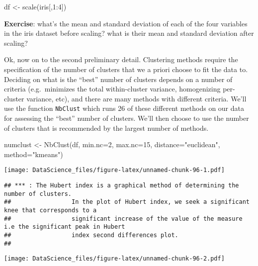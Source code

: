 \documentclass[
]{book}
\newenvironment{Shaded}{\begin{snugshade}}{\end{snugshade}}
\newcommand{\AttributeTok}[1]{\textcolor[rgb]{0.77,0.63,0.00}{#1}}
\newcommand{\DecValTok}[1]{\textcolor[rgb]{0.00,0.00,0.81}{#1}}
\newcommand{\FunctionTok}[1]{\textcolor[rgb]{0.00,0.00,0.00}{#1}}
\newcommand{\NormalTok}[1]{#1}
\newcommand{\OtherTok}[1]{\textcolor[rgb]{0.56,0.35,0.01}{#1}}
\newcommand{\SpecialCharTok}[1]{\textcolor[rgb]{0.00,0.00,0.00}{#1}}
\newcommand{\StringTok}[1]{\textcolor[rgb]{0.31,0.60,0.02}{#1}}
\begin{document}
\begin{Shaded}
\begin{Highlighting}[]
\NormalTok{df }\OtherTok{\textless{}{-}} \FunctionTok{scale}\NormalTok{(iris[,}\DecValTok{1}\SpecialCharTok{:}\DecValTok{4}\NormalTok{])}
\end{Highlighting}
\end{Shaded}

\textbf{Exercise}: what's the mean and standard deviation of each of the four variables in the iris dataset before scaling? what is their mean and standard deviation after scaling?

Ok, now on to the second preliminary detail. Clustering methods require the specification of the number of clusters that we a priori choose to fit the data to. Deciding on what is the ``best'' number of clusters depends on a number of criteria (e.g.~minimizes the total within-cluster variance, homogenizing per-cluster variance, etc), and there are many methods with different criteria. We'll use the function \texttt{NbClust} which runs 26 of these different methods on our data for assessing the ``best'' number of clusters. We'll then choose to use the number of clusters that is recommended by the largest number of methods.

\begin{Shaded}
\begin{Highlighting}[]
\NormalTok{numclust }\OtherTok{\textless{}{-}} \FunctionTok{NbClust}\NormalTok{(df, }\AttributeTok{min.nc=}\DecValTok{2}\NormalTok{, }\AttributeTok{max.nc=}\DecValTok{15}\NormalTok{, }\AttributeTok{distance=}\StringTok{"euclidean"}\NormalTok{, }\AttributeTok{method=}\StringTok{"kmeans"}\NormalTok{)}
\end{Highlighting}
\end{Shaded}

\texttt{[image: DataScience\_files/figure-latex/unnamed-chunk-96-1.pdf]}

\begin{verbatim}
## *** : The Hubert index is a graphical method of determining the number of clusters.
##                 In the plot of Hubert index, we seek a significant knee that corresponds to a 
##                 significant increase of the value of the measure i.e the significant peak in Hubert
##                 index second differences plot. 
## 
\end{verbatim}

\texttt{[image: DataScience\_files/figure-latex/unnamed-chunk-96-2.pdf]}
\end{document}
